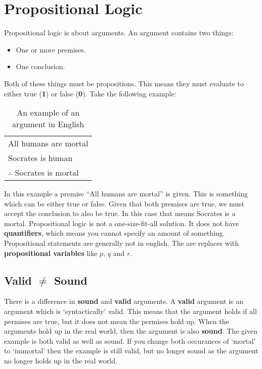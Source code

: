 \section{Propositional Logic}

Propositional logic is about arguments.
An argument contains two things:

\begin{itemize}
	\item
	      One or more premises.
	\item
	      One conclusion.
\end{itemize}

Both of these things must be propositions.
This means they must evaluate to either true ({\bf 1}) or false ({\bf 0}).
Take the following example:

\begin{table}[h]
	\centering
	\begin{tabular}{l}
		All humans are mortal \\
		Socrates is human     \\
		\hline
		$\therefore$ Socrates is mortal
	\end{tabular}
	\caption{An example of an argument in English}
\end{table}

In this example a premise ``All humans are mortal'' is given.
This is something which can be either true or false.
Given that both premises are true, we must accept the conclusion to also be true.
In this case that means Socrates is a mortal.
Propositional logic is not a one-size-fit-all solution.
It does not have {\bf quantifiers}, which means you cannot specify an amount of something.
Propositional statements are generally not in english.
The are replaces with {\bf propositional variables} like \(p\), \(q\) and \(r\).

\subsection{Valid $\neq$ Sound}
There is a difference in {\bf sound} and {\bf valid} arguments.
A {\bf valid} argument is an argument which is `syntactically' valid.
This means that the argument holds if all permises are true, but it does not mean the permises hold up.
When the arguments hold up in the real world, then the argument is also {\bf sound}.
The given example is both valid as well as sound.
If you change both occurances of `mortal' to `immortal'
then the example is still valid, but no longer sound as the argument no longer holds up in the real world.

